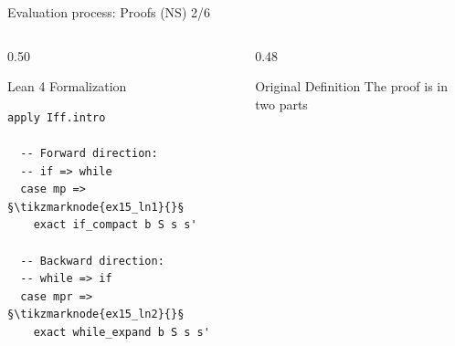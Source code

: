 \documentclass[xcolor={dvipsnames,table}]{beamer}
\begin{document}
\begin{frame}[fragile]{Evaluation process: \alert{Proofs} (NS) 2/6}

    \begin{columns}[T]
        
        \begin{column}{0.50\textwidth}
            \begin{block}{Lean 4 Formalization}
                \begin{lstlisting}[style=lean4, basicstyle=\scriptsize\ttfamily]
  apply Iff.intro

  -- Forward direction:
  -- if => while
  case mp => §\tikzmarknode{ex15_ln1}{}§
    exact if_compact b S s s'

  -- Backward direction:
  -- while => if
  case mpr => §\tikzmarknode{ex15_ln2}{}§
    exact while_expand b S s s'
                \end{lstlisting}
            \end{block}
        \end{column}

        \begin{column}{0.48\textwidth}
            \begin{block}{Original Definition}
\vspace{0.8em}
\scriptsize
The proof is in two parts
            \end{block}
        \end{column}
    \end{columns}



\end{frame}
\end{document}
